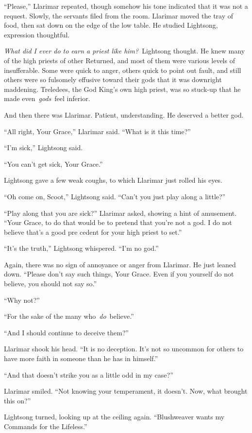“Please,” Llarimar repeated, though somehow his tone indicated that it was not a request. Slowly, the servants filed from the room. Llarimar moved the tray of food, then sat down on the edge of the low table. He studied Lightsong, expression thoughtful.

\textit{What did I ever do to earn a priest like him?}~Lightsong thought. He knew many of the high priests of other Returned, and most of them were various levels of insufferable. Some were quick to anger, others quick to point out fault, and still others were so fulsomely effusive toward their gods that it was downright maddening. Treledees, the God King’s own high priest, was so stuck-up that he made even~\textit{gods}~feel inferior.

And then there was Llarimar. Patient, understanding. He deserved a better god.

“All right, Your Grace,” Llarimar said. “What is it this time?”

“I’m sick,” Lightsong said.

“You can’t get sick, Your Grace.”

Lightsong gave a few weak coughs, to which Llarimar just rolled his eyes.

“Oh come on, Scoot,” Lightsong said. “Can’t you just play along a little?”

“Play along that you are sick?” Llarimar asked, showing a hint of amusement. “Your Grace, to do that would be to pretend that you’re not a god. I do not believe that’s a good pre cedent for your high priest to set.”

“It’s the truth,” Lightsong whispered. “I’m no god.”

Again, there was no sign of annoyance or anger from Llarimar. He just leaned down. “Please don’t say such things, Your Grace. Even if you yourself do not believe, you should not say so.”

“Why not?”

“For the sake of the many who~\textit{do}~believe.”

“And I should continue to deceive them?”

Llarimar shook his head. “It is no deception. It’s not so uncommon for others to have more faith in someone than he has in himself.”

“And that doesn’t strike you as a little odd in my case?”

Llarimar smiled. “Not knowing your temperament, it doesn’t. Now, what brought this on?”

Lightsong turned, looking up at the ceiling again. “Blushweaver wants my Commands for the Lifeless.”


